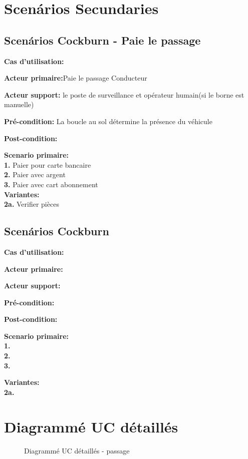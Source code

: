 \section{Scenários Secundaries}
\subsection{Scenários Cockburn - Paie le passage} \label{subsec:paie}
\textbf{Cas d'utilisation:}

\textbf{Acteur primaire:}Paie le passage Conducteur

\textbf{Acteur support:} le poste de surveillance et opérateur humain(si le borne est manuelle)

\textbf{Pré-condition: } La boucle au sol détermine la présence du véhicule
 
\textbf{Post-condition: } 

\textbf{Scenario primaire: } \\
    \textbf{1.} Paier pour carte bancaire\\
    \textbf{2.} Paier avec argent\\
    \textbf{3.} Paier avec cart abonnement\\

\textbf{Variantes:}\\
    \textbf{2a.} Verifier pièces %
\subsection{Scenários Cockburn} \label{subsec:}
\textbf{Cas d'utilisation:}

\textbf{Acteur primaire:}

\textbf{Acteur support:}

\textbf{Pré-condition: } 
 
\textbf{Post-condition: } 

\textbf{Scenario primaire: } \\
    \textbf{1.} \\
    \textbf{2.} \\
    \textbf{3.}

\textbf{Variantes:}\\
    \textbf{2a.} 
\newpage
\section*{Diagrammé UC détaillés}
\begin{figure}[h]
    \centering
    \caption{Diagrammé UC détaillés - passage}
    \label{fig:my_label}
\end{figure}